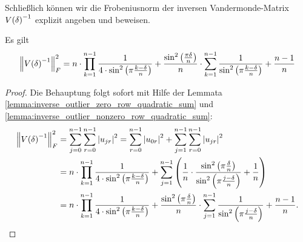 Schließlich können wir die Frobeniusnorm der inversen Vandermonde-Matrix
$V \! \left( \delta \right)^{-1}$ explizit angeben und beweisen.
\begin{theorem}
    Es gilt
    \begin{equation}
        \left\lVert  V \! \left( \delta \right)^{-1}  \right\rVert_F^2
        = n \cdot \prod_{k=1}^{n-1} \frac{1}{4 \cdot \sin^2 \left( \pi \frac{k-\delta}{n} \right)}
          + \frac{\sin^2 \left( \frac{\pi \delta}{n} \right)}{n} \cdot \sum_{k=1}^{n-1} \frac{1}{\sin^2 \left( \pi \frac{k-\delta}{n} \right)}
          + \frac{n-1}{n}
    \end{equation}
\end{theorem}
\begin{proof}
    Die Behauptung folgt sofort mit Hilfe der Lemmata
    \ref{lemma:inverse_outlier_zero_row_quadratic_sum} und
    \ref{lemma:inverse_outlier_nonzero_row_quadratic_sum}:
    \[
        \begin{split}
            \left\lVert  V \! \left( \delta \right)^{-1}  \right\rVert_F^2
            &= \sum_{j=0}^{n-1} \sum_{r=0}^{n-1} \left\lvert u_{jr} \right\rvert^2
             = \sum_{r=0}^{n-1} \left\lvert u_{0r} \right\rvert^2
             + \sum_{j=1}^{n-1} \sum_{r=0}^{n-1} \left\lvert u_{jr} \right\rvert^2\\
            &= n \cdot \prod_{k=1}^{n-1} \frac{1}{4 \cdot \sin^2 \left( \pi \frac{k-\delta}{n} \right)}
             + \sum_{j=1}^{n-1} \left( \frac{1}{n} \cdot \frac{\sin^2 \left( \pi \frac{\delta}{n} \right)}{\sin^2 \left( \pi \frac{j - \delta}{n} \right)}
             + \frac{1}{n} \right)\\
            &= n \cdot \prod_{k=1}^{n-1} \frac{1}{4 \cdot \sin^2 \left( \pi \frac{k-\delta}{n} \right)}
             + \frac{\sin^2 \left( \pi \frac{\delta}{n} \right)}{n} \cdot \sum_{j=1}^{n-1} \frac{1}{\sin^2 \left( \pi \frac{j - \delta}{n} \right)}
             + \frac{n-1}{n}.
         \end{split}
     \]
\end{proof}
